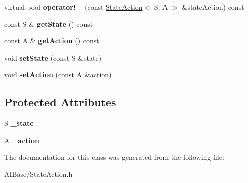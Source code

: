 \begin{DoxyCompactItemize}
\item 
\hypertarget{classAI_1_1StateAction_ad0e12e35055091f159f79a952e741f1e}{virtual bool {\bfseries operator!=} (const \hyperlink{classAI_1_1StateAction}{State\-Action}$<$ S, A $>$ \&state\-Action) const }\label{classAI_1_1StateAction_ad0e12e35055091f159f79a952e741f1e}

\item 
\hypertarget{classAI_1_1StateAction_ac9bdee11a201a7fd87071ab64b2a9743}{const S \& {\bfseries get\-State} () const }\label{classAI_1_1StateAction_ac9bdee11a201a7fd87071ab64b2a9743}

\item 
\hypertarget{classAI_1_1StateAction_ae1cec3a09af9a8ca110857baa7727758}{const A \& {\bfseries get\-Action} () const }\label{classAI_1_1StateAction_ae1cec3a09af9a8ca110857baa7727758}

\item 
\hypertarget{classAI_1_1StateAction_a6ae04532d8d228dc4eb128c8ca223ba4}{void {\bfseries set\-State} (const S \&state)}\label{classAI_1_1StateAction_a6ae04532d8d228dc4eb128c8ca223ba4}

\item 
\hypertarget{classAI_1_1StateAction_aa842cc33bf4d9cba87212a3a9fb94796}{void {\bfseries set\-Action} (const A \&action)}\label{classAI_1_1StateAction_aa842cc33bf4d9cba87212a3a9fb94796}

\end{DoxyCompactItemize}
\subsection*{Protected Attributes}
\begin{DoxyCompactItemize}
\item 
\hypertarget{classAI_1_1StateAction_a0e64eecf8347c051e20e1a015ef9960a}{S {\bfseries \-\_\-state}}\label{classAI_1_1StateAction_a0e64eecf8347c051e20e1a015ef9960a}

\item 
\hypertarget{classAI_1_1StateAction_a951975a1853e815c68bd7400f4f1d97a}{A {\bfseries \-\_\-action}}\label{classAI_1_1StateAction_a951975a1853e815c68bd7400f4f1d97a}

\end{DoxyCompactItemize}


The documentation for this class was generated from the following file\-:\begin{DoxyCompactItemize}
\item 
A\-I\-Base/State\-Action.\-h\end{DoxyCompactItemize}
